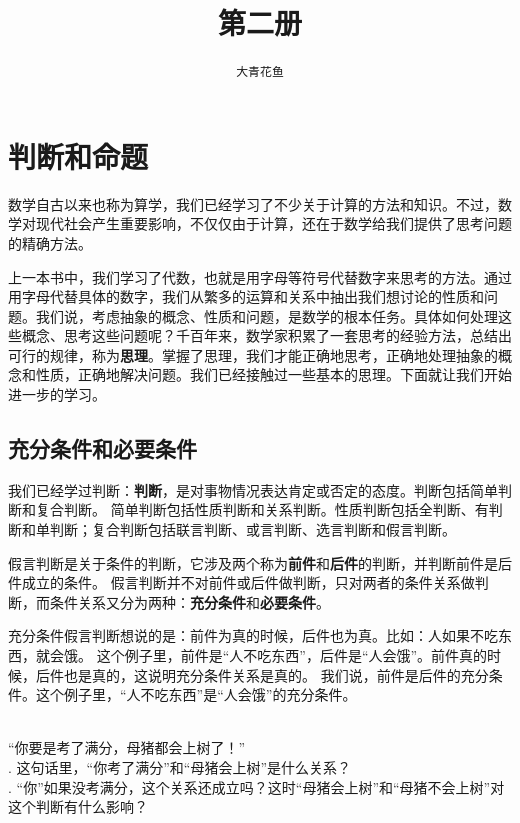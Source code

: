\documentclass[12pt,UTF8,fontset=none]{ctexbook}
\title{\zihao{0} \bfseries 第二册}
\author{\zihao{2} \texttt{大青花鱼}}
\date{}
\begin{document}
\maketitle
\tableofcontents
\newpage

\chapter{判断和命题}

数学自古以来也称为算学，我们已经学习了不少关于计算的方法和知识。不过，数学对现代社会产生重要影响，不仅仅由于计算，还在于数学给我们提供了思考问题的精确方法。

上一本书中，我们学习了代数，也就是用字母等符号代替数字来思考的方法。通过用字母代替具体的数字，我们从繁多的运算和关系中抽出我们想讨论的性质和问题。我们说，考虑抽象的概念、性质和问题，是数学的根本任务。具体如何处理这些概念、思考这些问题呢？千百年来，数学家积累了一套思考的经验方法，总结出可行的规律，称为\textbf{思理}。掌握了思理，我们才能正确地思考，正确地处理抽象的概念和性质，正确地解决问题。我们已经接触过一些基本的思理。下面就让我们开始进一步的学习。

\section{充分条件和必要条件}
我们已经学过判断：\textbf{判断}，是对事物情况表达肯定或否定的态度。判断包括简单判断和复合判断。
简单判断包括性质判断和关系判断。性质判断包括全判断、有判断和单判断；复合判断包括联言判断、或言判断、选言判断和假言判断。

假言判断是关于条件的判断，它涉及两个称为\textbf{前件}和\textbf{后件}的判断，并判断前件是后件成立的条件。
假言判断并不对前件或后件做判断，只对两者的条件关系做判断，而条件关系又分为两种：\textbf{充分条件}和\textbf{必要条件}。

充分条件假言判断想说的是：前件为真的时候，后件也为真。比如：人如果不吃东西，就会饿。
这个例子里，前件是“人不吃东西”，后件是“人会饿”。前件真的时候，后件也是真的，这说明充分条件关系是真的。
我们说，前件是后件的充分条件。这个例子里，“人不吃东西”是“人会饿”的充分条件。

\begin{et}\label{et:2-0-0}
    \mbox{}\\
    \indent “你要是考了满分，母猪都会上树了！”\\
    . 这句话里，“你考了满分”和“母猪会上树”是什么关系？\\
    . “你”如果没考满分，这个关系还成立吗？这时“母猪会上树”和“母猪不会上树”对这个判断有什么影响？
\end{et}
\end{document}
